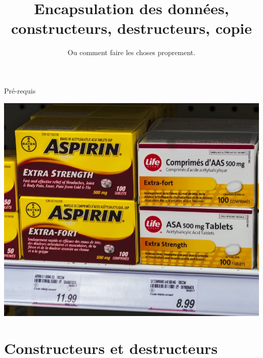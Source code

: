 \documentclass[c]{beamer}
\title{Encapsulation des données, constructeurs, destructeurs, copie}
\subtitle{Ou comment faire les choses proprement.}
\begin{document}
\maketitle

\begin{frame}[fragile]{Pré-requis}
\begin{center}
\includegraphics[width=0.65\paperwidth]{aspirine.jpg}
\end{center}
\end{frame}

\part{Constructeurs et destructeurs}
\frame{\partpage}
\end{document}
